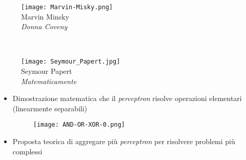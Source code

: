 \begin{frame}[t,fragile]
{{\begin{minipage}[t]{\textwidth}
\begin{minipage}[t]{0.3\textwidth}
\begin{minipage}[t]{\textwidth}
\begin{figure}[ht]
					\texttt{[image: Marvin-Misky.png]}
					{\tiny\\Marvin Minsky\\\vspace*{-4pt}\textit{\textcopyright Donna Coveny}}
				\end{figure}
			\end{minipage}
			\\
			\begin{minipage}[t]{\textwidth}
				\begin{figure}[ht]
					\texttt{[image: Seymour\_Papert.jpg]}
					{\tiny\\Seymour Papert\\\vspace*{-4pt}\textit{\textcopyright Matematicamente}}
				\end{figure}
			\end{minipage}
		\end{minipage}
		\hfill
		\begin{minipage}[t]{0.65\textwidth}
			\begin{itemize}[leftmargin=0pt,align=right]
			\item[\alert{\faHandORight}] Dimostrazione matematica che il \textit{perceptron} risolve operazioni elementari (\alert{linearmente separabili})
			\begin{figure}[ht]
				\texttt{[image: AND-OR-XOR-0.png]}
			\end{figure}
			\item[\alert{\faHandORight}] Proposta teorica di \alert{aggregare più \textit{perceptron}} per risolvere problemi più complessi
		\end{itemize}
		\end{minipage}
	\end{minipage}
	}
	}
\end{frame}
